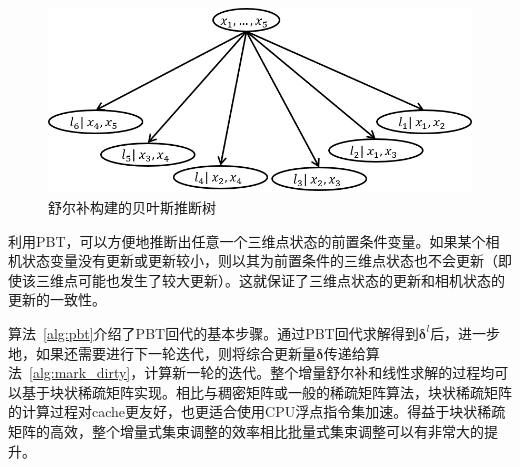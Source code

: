 \begin{figure}[htb!]
    \centering
    \includegraphics[scale=.8]{Pictures/bayes_forest.png}
    \caption{舒尔补构建的贝叶斯推断树}
    \label{fig:bayes_forest}
\end{figure}

利用PBT，可以方便地推断出任意一个三维点状态的前置条件变量。如果某个相机状态变量没有更新或更新较小，则以其为前置条件的三维点状态也不会更新（即使该三维点可能也发生了较大更新）。这就保证了三维点状态的更新和相机状态的更新的一致性。



算法~\ref{alg:pbt}介绍了PBT回代的基本步骤。通过PBT回代求解得到$\bm{\delta}^l$后，进一步地，如果还需要进行下一轮迭代，则将综合更新量$\bm{\delta}$传递给算法~\ref{alg:mark_dirty}，计算新一轮的迭代。整个增量舒尔补和线性求解的过程均可以基于块状稀疏矩阵实现。相比与稠密矩阵或一般的稀疏矩阵算法，块状稀疏矩阵的计算过程对cache更友好，也更适合使用CPU浮点指令集加速。得益于块状稀疏矩阵的高效，整个增量式集束调整的效率相比批量式集束调整可以有非常大的提升。
